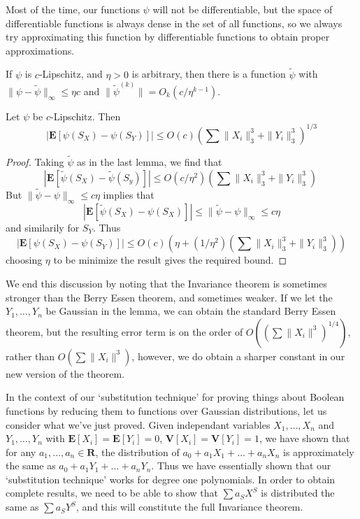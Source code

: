 Most of the time, our functions $\psi$ will not be differentiable, but the space of differentiable functions is always dense in the set of all functions, so we always try approximating this function by differentiable functions to obtain proper approximations.

\begin{lemma}
    If $\psi$ is $c$-Lipschitz, and $\eta > 0$ is arbitrary, then there is a function $\tilde{\psi}$ with $\| \psi - \tilde{\psi} \|_\infty \leq \eta c$ and $\| \tilde{\psi}^{(k)} \| = O_k(c/\eta^{k-1})$.
\end{lemma}

\begin{theorem}
    Let $\psi$ be $c$-Lipschitz. Then
    \[ |\mathbf{E}[\psi(S_X) - \psi(S_Y)]| \leq O(c) \left( \sum \| X_i \|_3^3 + \| Y_i \|_3^3 \right)^{1/3} \]
\end{theorem}
\begin{proof}
    Taking $\tilde{\psi}$ as in the last lemma, we find that
    \[ |\mathbf{E}[\tilde{\psi}(S_X) - \tilde{\psi}(S_y)]| \leq O(c/\eta^2) \left( \sum \| X_i \|_3^3 + \| Y_i \|_3^3 \right) \ \]
    But $\| \tilde{\psi} - \psi \|_\infty \leq c \eta$ implies that
    \[ |\mathbf{E}[\tilde{\psi}(S_X) - \psi(S_X)]| \leq \| \tilde{\psi} - \psi \|_\infty \leq c\eta \]
    and similarily for $S_Y$. Thus
    \[ |\mathbf{E}[\psi(S_X) - \psi(S_Y)]| \leq O(c) \left(\eta + (1/\eta^2) \left( \sum \| X_i \|_3^3 + \| Y_i \|_3^3 \right) \right) \]
    choosing $\eta$ to be minimize the result gives the required bound.
\end{proof}

We end this discussion by noting that the Invariance theorem is sometimes stronger than the Berry Essen theorem, and sometimes weaker. If we let the $Y_1, \dots, Y_n$ be Gaussian in the lemma, we can obtain the standard Berry Essen theorem, but the resulting error term is on the order of $O((\sum \| X_i \|^3)^{1/4})$, rather than $O(\sum \| X_i \|^3)$, however, we do obtain a sharper constant in our new version of the theorem.

In the context of our `substitution technique' for proving things about Boolean functions by reducing them to functions over Gaussian distributions, let us consider what we've just proved. Given independant variables $X_1, \dots, X_n$ and $Y_1, \dots, Y_n$ with $\mathbf{E}[X_i] = \mathbf{E}[Y_i] = 0$, $\mathbf{V}[X_i] = \mathbf{V}[Y_i] = 1$, we have shown that for any $a_1, \dots, a_n \in \mathbf{R}$, the distribution of $a_0 + a_1 X_1 + \dots + a_n X_n$ is approximately the same as $a_0 + a_1 Y_1 + \dots + a_n Y_n$. Thus we have essentially shown that our `substitution technique' works for degree one polynomials. In order to obtain complete results, we need to be able to show that $\sum a_S X^S$ is distributed the same as $\sum a_S Y^S$, and this will constitute the full Invariance theorem.

